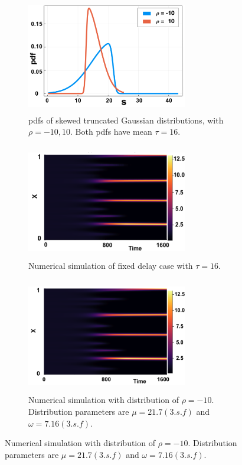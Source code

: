 \begin{figure}[H]
    \centering
    \begin{subfigure}[t]{0.45\textwidth}
        \centering
        \includegraphics[width=7cm,height=5cm]{dist16.png}
        \caption{pdfs of skewed truncated Gaussian distributions, with $\rho=-10,10$. Both pdfs have mean $\tau=16$.}
        \label{}
    \end{subfigure}
    \hfill
    \begin{subfigure}[t]{0.45\textwidth}
        \centering
        \includegraphics[width=7cm,height=5cm]{fixt16.png}
        \caption{Numerical simulation of fixed delay case with $\tau=16$.}
        \label{}
    \end{subfigure}
    \hfill
    \begin{subfigure}[t]{0.45\textwidth}
        \centering
        \includegraphics[width=7cm,height=5cm]{t16m10.png}
        \caption{Numerical simulation with distribution of $\rho=-10$. Distribution parameters are $\mu=21.7(3.s.f)$ and $\omega=7.16(3.s.f)$.}
        \label{}
    \end{subfigure}

\end{figure}
